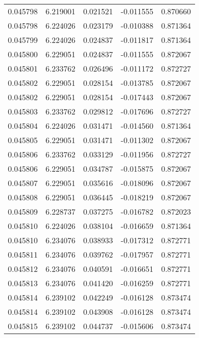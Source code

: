 \begin{tabular}{lrrrr}
0.045798    &  6.219001 &  0.021521 & -0.011555 &             0.870660 \\
0.045798    &  6.224026 &  0.023179 & -0.010388 &             0.871364 \\
0.045799    &  6.224026 &  0.024837 & -0.011817 &             0.871364 \\
0.045800    &  6.229051 &  0.024837 & -0.011555 &             0.872067 \\
0.045801    &  6.233762 &  0.026496 & -0.011172 &             0.872727 \\
0.045802    &  6.229051 &  0.028154 & -0.013785 &             0.872067 \\
0.045802    &  6.229051 &  0.028154 & -0.017443 &             0.872067 \\
0.045803    &  6.233762 &  0.029812 & -0.017696 &             0.872727 \\
0.045804    &  6.224026 &  0.031471 & -0.014560 &             0.871364 \\
0.045805    &  6.229051 &  0.031471 & -0.011302 &             0.872067 \\
0.045806    &  6.233762 &  0.033129 & -0.011956 &             0.872727 \\
0.045806    &  6.229051 &  0.034787 & -0.015875 &             0.872067 \\
0.045807    &  6.229051 &  0.035616 & -0.018096 &             0.872067 \\
0.045808    &  6.229051 &  0.036445 & -0.018219 &             0.872067 \\
0.045809    &  6.228737 &  0.037275 & -0.016782 &             0.872023 \\
0.045810    &  6.224026 &  0.038104 & -0.016659 &             0.871364 \\
0.045810    &  6.234076 &  0.038933 & -0.017312 &             0.872771 \\
0.045811    &  6.234076 &  0.039762 & -0.017957 &             0.872771 \\
0.045812    &  6.234076 &  0.040591 & -0.016651 &             0.872771 \\
0.045813    &  6.234076 &  0.041420 & -0.016259 &             0.872771 \\
0.045814    &  6.239102 &  0.042249 & -0.016128 &             0.873474 \\
0.045814    &  6.239102 &  0.043908 & -0.016128 &             0.873474 \\
0.045815    &  6.239102 &  0.044737 & -0.015606 &             0.873474 \\

\end{tabular}
